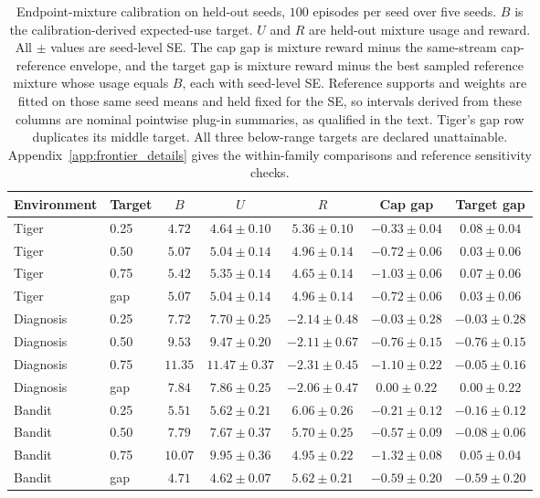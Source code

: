 \documentclass[runningheads]{llncs}
\newcommand{\tablefontsize}{\fontsize{9}{11}\selectfont\setlength{\tabcolsep}{3pt}}
\begin{document}
\begin{table}[t]
\centering
\caption{Endpoint-mixture calibration on held-out seeds, $100$ episodes per seed over five seeds. $B$ is the calibration-derived expected-use target. $U$ and $R$ are held-out mixture usage and reward. All $\pm$ values are seed-level SE. The cap gap is mixture reward minus the same-stream cap-reference envelope, and the target gap is mixture reward minus the best sampled reference mixture whose usage equals $B$, each with seed-level SE. Reference supports and weights are fitted on those same seed means and held fixed for the SE, so intervals derived from these columns are nominal pointwise plug-in summaries, as qualified in the text. Tiger's gap row duplicates its middle target. All three below-range targets are declared unattainable. Appendix~\ref{app:frontier_details} gives the within-family comparisons and reference sensitivity checks.}
\label{tab:budget_frontier_main}
\tablefontsize
\setlength{\tabcolsep}{3pt}
\begin{tabular}{@{}llccccc@{}}
\toprule
Environment & Target & $B$ & $U$ & $R$ & Cap gap & Target gap \\
\midrule
Tiger & 0.25 & $4.72$ & $4.64 \pm 0.10$ & $5.36 \pm 0.10$ & $-0.33 \pm 0.04$ & $0.08 \pm 0.04$ \\
Tiger & 0.50 & $5.07$ & $5.04 \pm 0.14$ & $4.96 \pm 0.14$ & $-0.72 \pm 0.06$ & $0.03 \pm 0.06$ \\
Tiger & 0.75 & $5.42$ & $5.35 \pm 0.14$ & $4.65 \pm 0.14$ & $-1.03 \pm 0.06$ & $0.07 \pm 0.06$ \\
Tiger & gap & $5.07$ & $5.04 \pm 0.14$ & $4.96 \pm 0.14$ & $-0.72 \pm 0.06$ & $0.03 \pm 0.06$ \\
\midrule
Diagnosis & 0.25 & $7.72$ & $7.70 \pm 0.25$ & $-2.14 \pm 0.48$ & $-0.03 \pm 0.28$ & $-0.03 \pm 0.28$ \\
Diagnosis & 0.50 & $9.53$ & $9.47 \pm 0.20$ & $-2.11 \pm 0.67$ & $-0.76 \pm 0.15$ & $-0.76 \pm 0.15$ \\
Diagnosis & 0.75 & $11.35$ & $11.47 \pm 0.37$ & $-2.31 \pm 0.45$ & $-1.10 \pm 0.22$ & $-0.05 \pm 0.16$ \\
Diagnosis & gap & $7.84$ & $7.86 \pm 0.25$ & $-2.06 \pm 0.47$ & $0.00 \pm 0.22$ & $0.00 \pm 0.22$ \\
\midrule
Bandit & 0.25 & $5.51$ & $5.62 \pm 0.21$ & $6.06 \pm 0.26$ & $-0.21 \pm 0.12$ & $-0.16 \pm 0.12$ \\
Bandit & 0.50 & $7.79$ & $7.67 \pm 0.37$ & $5.70 \pm 0.25$ & $-0.57 \pm 0.09$ & $-0.08 \pm 0.06$ \\
Bandit & 0.75 & $10.07$ & $9.95 \pm 0.36$ & $4.95 \pm 0.22$ & $-1.32 \pm 0.08$ & $0.05 \pm 0.04$ \\
Bandit & gap & $4.71$ & $4.62 \pm 0.07$ & $5.62 \pm 0.21$ & $-0.59 \pm 0.20$ & $-0.59 \pm 0.20$ \\
\bottomrule
\end{tabular}
\end{table}
\end{document}
